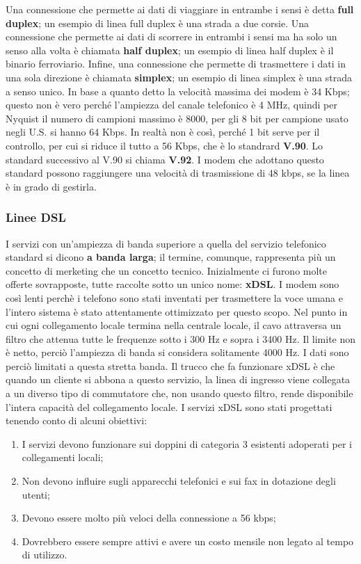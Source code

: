 Una connessione che permette ai dati di viaggiare in entrambe i sensi è detta \textbf{full duplex}; un esempio di linea full duplex è una strada a due corsie. Una connessione che permette ai dati di scorrere in entrambi i sensi ma ha solo un senso alla volta è chiamata \textbf{half duplex}; un esempio di linea half duplex è il binario ferroviario. Infine, una connessione che permette di trasmettere i dati in una sola direzione è chiamata \textbf{simplex}; un esempio di linea simplex è una strada a senso unico. 
In base a quanto detto la velocità massima dei modem è 34 Kbps; questo non è vero perché l'ampiezza del canale telefonico è 4 MHz, quindi per Nyquist il numero di campioni massimo è 8000, per gli 8 bit per campione usato negli U.S. si hanno 64 Kbps. In realtà non è così, perché 1 bit serve per il controllo, per cui si riduce il tutto a 56 Kbps, che è lo standrard \textbf{V.90}. Lo standard successivo al V.90 si chiama \textbf{V.92}. I modem che adottano questo standard possono raggiungere una velocità di trasmissione di 48 kbps, se la linea è in grado di gestirla.

\subsubsection*{Linee DSL}

I servizi con un'ampiezza di banda superiore a quella del servizio telefonico standard si dicono \textbf{a banda larga}; il termine, comunque, rappresenta più un concetto di merketing che un concetto tecnico.
Inizialmente ci furono molte offerte sovrapposte, tutte raccolte sotto un unico nome: \textbf{xDSL}.
I modem sono così lenti perchè i telefono sono stati inventati per trasmettere la voce umana e l'intero sistema è stato attentamente ottimizzato per questo scopo. Nel punto in cui ogni collegamento locale termina nella centrale locale, il cavo attraversa un filtro che attenua tutte le frequenze sotto i 300 Hz e sopra i 3400 Hz. Il limite non è netto, perciò l'ampiezza di banda si considera solitamente 4000 Hz. I dati sono perciò limitati a questa stretta banda.
Il trucco che fa funzionare xDSL è che quando un cliente si abbona a questo servizio, la linea di ingresso viene collegata a un diverso tipo di commutatore che, non usando questo filtro, rende disponibile l'intera capacità del collegamento locale.
I servizi xDSL sono stati progettati tenendo conto di alcuni obiettivi:

\begin{enumerate}

\item I servizi devono funzionare sui doppini di categoria 3 esistenti adoperati per i collegamenti locali;
\item Non devono influire sugli apparecchi telefonici e sui fax in dotazione degli utenti;
\item Devono essere molto più veloci della connessione a 56 kbps;
\item Dovrebbero essere sempre attivi e avere un costo mensile non legato al tempo di utilizzo.

\end{enumerate}

